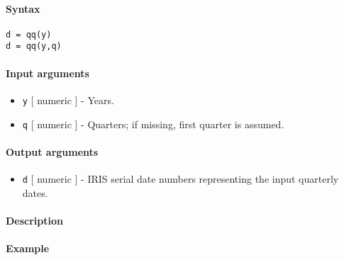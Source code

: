 


	\paragraph{Syntax}\label{syntax}

\begin{verbatim}
d = qq(y)
d = qq(y,q)
\end{verbatim}

\paragraph{Input arguments}\label{input-arguments}

\begin{itemize}
\item
  \texttt{y} {[} numeric {]} - Years.
\item
  \texttt{q} {[} numeric {]} - Quarters; if missing, first quarter is
  assumed.
\end{itemize}

\paragraph{Output arguments}\label{output-arguments}

\begin{itemize}
\itemsep1pt\parskip0pt
\item
  \texttt{d} {[} numeric {]} - IRIS serial date numbers representing the
  input quarterly dates.
\end{itemize}

\paragraph{Description}\label{description}

\paragraph{Example}\label{example}


